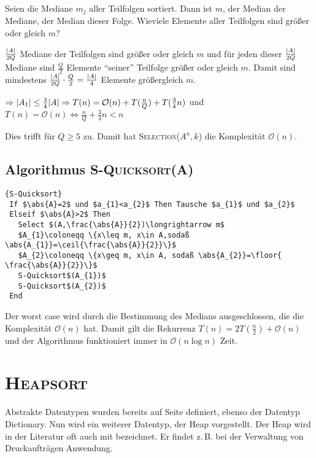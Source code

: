 \documentclass[ngerman,draft,parskip=half*,twoside]{scrreprt}
\theoremstyle{break}
\theoremstyle{nonumberbreak}
\newcommand*{\OO}{\mathcal{O}}      %
\DeclarePairedDelimiter{\abs}{\lvert}{\rvert}
\DeclarePairedDelimiter{\floor}{\lfloor}{\rfloor}
\DeclarePairedDelimiter{\ceil}{\lceil}{\rceil}
\newcommand*{\highl}[2][]{\textbf{\boldmath{#2}}%
  \ifthenelse{\equal{#1}{}}{\index{#2}}{\index{#1}}%
}
\begin{document}
 
Seien die Mediane $m_{j}$ aller Teilfolgen sortiert. Dann ist $m$, der Median der Mediane, der Median dieser Folge. 
Wieviele Elemente aller Teilfolgen sind größer oder gleich $m$?

 $\frac{\abs{A}}{2Q}$ Mediane der Teilfolgen sind größer oder gleich $m$ und für jeden dieser $\frac{\abs{A}}{2Q}$
 Mediane sind $\frac{Q}{2}$ Elemente "`seiner"' Teilfolge größer oder gleich $m$. Damit sind mindestens
 $\frac{\abs{A}}{2Q}\cdot \frac{Q}{2}=\frac{\abs{A}}{4}$ Elemente größergleich $m$.
	
 $\Rightarrow\abs{A_{1}}\leq\frac{3}{4}\abs{A}\Rightarrow T(n)=\OO(n)+T(\frac{n}{Q})+T(\frac{3}{4}n)$
und $T(n)=\OO(n)\Longleftrightarrow\frac{n}{Q}+\frac{3}{4}n<n$

 Dies trifft für $Q\geq 5$ zu. Damit hat \textsc{Selection}($A^n,k$) die Komplexität $\OO(n)$.

 \subsection{Algorithmus \textsc{S-Quicksort(A)}}

\begin{Algorithmus}[ht]
\begin{lstlisting}[frame=tlrb, mathescape=true, title=\textsc{S-Quicksort}, gobble=1]{S-Quicksort}
 If $\abs{A}=2$ und $a_{1}<a_{2}$ Then Tausche $a_{1}$ und $a_{2}$
 Elseif $\abs{A}>2$ Then
   Select $(A,\frac{\abs{A}}{2})\longrightarrow m$
   $A_{1}\coloneqq \{x\leq m, x\in A,sodaß \abs{A_{1}}=\ceil{\frac{\abs{A}}{2}}\}$
   $A_{2}\coloneqq \{x\geq m, x\in A, sodaß \abs{A_{2}}=\floor{ \frac{\abs{A}}{2}}\}$
   S-Quicksort$(A_{1})$
   S-Quicksort$(A_{2})$
 End
 \end{lstlisting}
  \end{Algorithmus}

Der worst case wird durch die Bestimmung des Medians ausgeschlossen, die die Komplexität $\OO(n)$ hat. Damit gilt die Rekurrenz
$T(n)=2T(\frac{n}{2})+\OO(n)$ und der Algorithmus funktioniert immer in $\OO(n \log n)$ Zeit.
 
\section{\textsc{Heapsort}}
Abstrakte Datentypen wurden bereits auf Seite \pageref{ADT} definiert,
ebenso der Datentyp Dictionary. Nun wird ein weiterer
Datentyp, der Heap vorgestellt. Der Heap wird in der Literatur oft auch mit \highl{Priority Queue} bezeichnet.
Er findet z.\,B. bei der Verwaltung von Druckaufträgen Anwendung.
\end{document}

